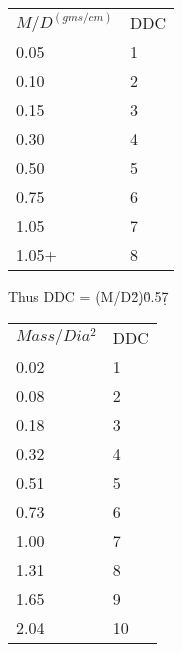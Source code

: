 \begin{tabular}{||l|l||}
\(M/D^{(gms/cm)} \)	&	DDC \\
0.05				& 1 \\
0.10       	        & 2  \\
0.15				& 3 \\
0.30				& 4 \\
0.50				& 5 \\
0.75				& 6 \\
1.05				& 7 \\
1.05+				& 8 \\
\end{tabular}

Thus DDC = (M/D\u2\d)\u0.5\d * 7

\begin{tabular}{||l|l||}
\(Mass/Dia^{2}\)    & DDC \\
0.02			& 1 \\
0.08			& 2 \\
0.18			& 3 \\
0.32			& 4 \\
0.51			& 5 \\
0.73			& 6 \\
1.00			& 7 \\
1.31			& 8 \\
1.65			& 9 \\
2.04			& 10 \\
\end{tabular}


